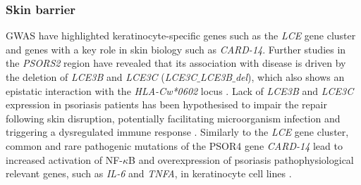 \subsubsection*{Skin barrier}

GWAS have highlighted keratinocyte-specific genes such as the \textit{LCE} gene cluster and genes with a key role in skin biology such as \textit{CARD-14}. Further studies in the \textit{PSORS2} region have revealed that its association with disease is driven by the deletion of \textit{LCE3B} and \textit{LCE3C} (\textit{LCE3C$\_ $LCE3B$\_ $del}), which also shows an epistatic interaction with the \textit{HLA-Cw*0602} locus \parencite{Cid2009}. Lack of \textit{LCE3B} and \textit{LCE3C} expression in psoriasis patients has been hypothesised to impair the repair following skin disruption, potentially facilitating microorganism infection and triggering a dysregulated immune response \parencite{Bergboer2011}. Similarly to the \textit{LCE} gene cluster, common and rare pathogenic mutations of the PSOR4 gene \textit{CARD-14} lead to increased activation of NF-$\kappa$B and overexpression of psoriasis pathophysiological relevant genes,  such as  \textit{IL-6} and \textit{TNFA}, in keratinocyte cell lines \parencite{Jordan2012}.





